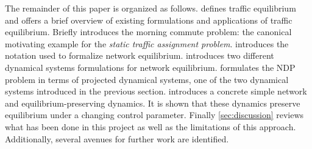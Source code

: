 The remainder of this paper is organized as follows.
 defines traffic equilibrium and offers a brief overview of existing formulations and applications of traffic equilibrium.
 Briefly introduces the morning commute problem: the canonical motivating example for the \textit{static traffic assignment problem}.
 introduces the notation used to formalize network equilibrium.
 introduces two different dynamical systems formulations for network equilibrium.
 formulates the NDP problem in terms of projected dynamical systems, one of the two dynamical systems introduced in the previous section.
 introduces a concrete simple network and equilibrium-preserving dynamics. It is shown that these dynamics preserve equilibrium under a changing control parameter.
Finally \cref{sec:discussion} reviews what has been done in this project as well as the limitations of this approach.
Additionally, several avenues for further work are identified.

